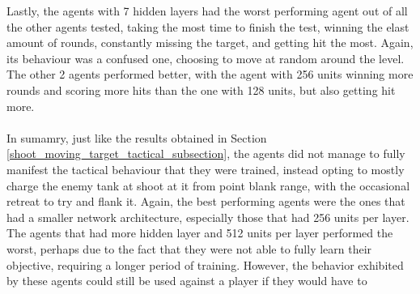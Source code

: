 Lastly, the agents with 7 hidden layers had the worst performing agent out of all the other agents tested, taking the most time to finish the test, winning the elast amount of rounds, constantly missing the target, and getting hit the most. Again, its behaviour was a confused one, choosing to move at random around the level. The other 2 agents performed better, with the agent with 256 units winning more rounds and scoring more hits than the one with 128 units, but also getting hit more.

\paragraph{}
In sumamry, just like the results obtained in Section \ref{shoot_moving_target_tactical_subsection}, the agents did not manage to fully manifest the tactical behaviour that they were trained, instead opting to mostly charge the enemy tank at shoot at it from point blank range, with the occasional retreat to try and flank it. Again, the best performing agents were the ones that had a smaller network architecture, especially those that had 256 units per layer. The agents that had more hidden layer and 512 units per layer performed the worst, perhaps due to the fact that they were not able to fully learn their objective, requiring a longer period of training. However, the behavior exhibited by these agents could still be used against a player if they would have to 

